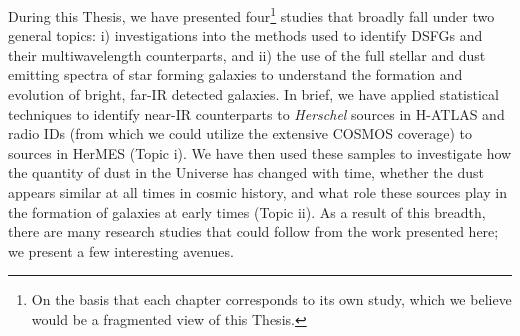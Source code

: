 During this Thesis, we have presented four\footnote{On the basis that each chapter corresponds to its own study, which we believe would be a fragmented view of this Thesis.} studies that broadly fall under two general topics: i) investigations into the methods used to identify DSFGs and their multiwavelength counterparts, and ii) the use of the full stellar and dust emitting spectra of star forming galaxies to understand the formation and evolution of bright, far-IR detected galaxies. In brief, we have applied statistical techniques to identify near-IR counterparts to \textit{Herschel} sources in H-ATLAS and radio IDs (from which we could utilize the extensive COSMOS coverage) to sources in HerMES (Topic i). We have then used these samples to investigate how the quantity of dust in the Universe has changed with time, whether the dust appears similar at all times in cosmic history, and what role these sources play in the formation of galaxies at early times (Topic ii). As a result of this breadth, there are many research studies that could follow from the work presented here; we present a few interesting avenues.

